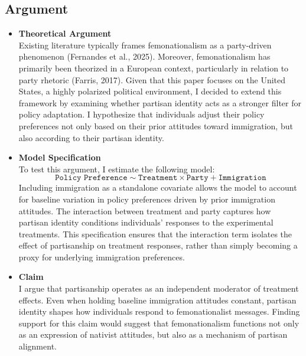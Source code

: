 \documentclass[12pt,letterpaper]{article}
\begin{document}
		\subsection*{Argument}
		\begin{itemize}
			\item \textbf{Theoretical Argument} \\[.2cm]
		Existing literature typically frames femonationalism as a party-driven phenomenon (Fernandes et al., 2025). Moreover, femonationalism has primarily been theorized in a European context, particularly in relation to party rhetoric (Farris, 2017). Given that this paper focuses on the United States, a highly polarized political environment, I decided to extend this framework by examining whether partisan identity acts as a stronger filter for policy adaptation. 	I hypothesize that individuals adjust their policy preferences not only based on their prior attitudes toward immigration, but also according to their partisan identity.
			\item \textbf{Model Specification} \\[.2cm]
		To test this argument, I estimate the following model:
		\[
		\texttt{Policy Preference} \sim \texttt{Treatment} \times \texttt{Party} + \texttt{Immigration}
		\]
		Including immigration as a standalone covariate allows the model to account for baseline variation in policy preferences driven by prior immigration attitudes. The interaction between treatment and party captures how partisan identity conditions individuals' responses to the experimental treatments. This specification ensures that the interaction term isolates the effect of partisanship on treatment responses, rather than simply becoming a proxy for underlying immigration preferences.
			\item \textbf{Claim} \\[.2cm]
		I argue that partisanship operates as an independent moderator of treatment effects. Even when holding baseline immigration attitudes constant, partisan identity shapes how individuals respond to femonationalist messages. Finding support for this claim would suggest that femonationalism functions not only as an expression of nativist attitudes, but also as a mechanism of partisan alignment.
		\end{itemize}
\end{document}
